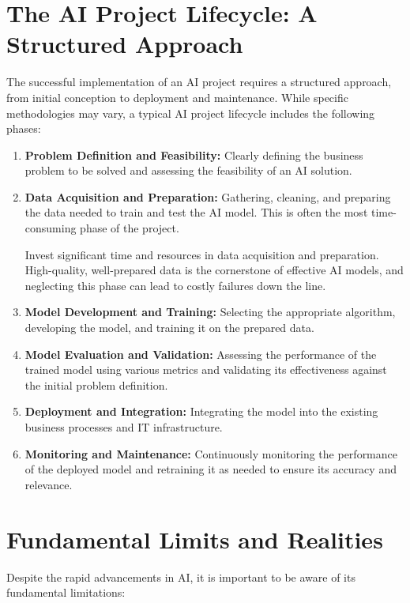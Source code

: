 \section{The AI Project Lifecycle: A Structured Approach}
\label{sec:ai_project_lifecycle}
The successful implementation of an AI project requires a structured approach, from initial conception to deployment and maintenance. While specific methodologies may vary, a typical AI project lifecycle includes the following phases:

\begin{enumerate}
    \item \textbf{Problem Definition and Feasibility:} Clearly defining the business problem to be solved and assessing the feasibility of an AI solution.
    \item \textbf{Data Acquisition and Preparation:} Gathering, cleaning, and preparing the data needed to train and test the AI model. This is often the most time-consuming phase of the project.
    \begin{tipbox}
Invest significant time and resources in data acquisition and preparation. High-quality, well-prepared data is the cornerstone of effective AI models, and neglecting this phase can lead to costly failures down the line.
    \end{tipbox}
    \item \textbf{Model Development and Training:} Selecting the appropriate algorithm, developing the model, and training it on the prepared data.
    \item \textbf{Model Evaluation and Validation:} Assessing the performance of the trained model using various metrics and validating its effectiveness against the initial problem definition.
    \item \textbf{Deployment and Integration:} Integrating the model into the existing business processes and IT infrastructure.
    \item \textbf{Monitoring and Maintenance:} Continuously monitoring the performance of the deployed model and retraining it as needed to ensure its accuracy and relevance.
\end{enumerate}

\section{Fundamental Limits and Realities}
\label{sec:fundamental_limits}
Despite the rapid advancements in AI, it is important to be aware of its fundamental limitations:

